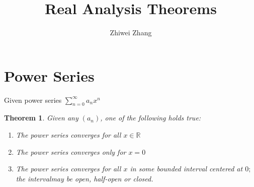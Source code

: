 \documentclass[12pt]{article}
\newtheorem{theorem}{Theorem}
\begin{document}
 
 
 
\title{Real Analysis Theorems}
\author{Zhiwei Zhang}
 
\maketitle
\section{Power Series}
Given power series $\sum _ { n = 0 } ^ { \infty } a _ { n } x ^ { n }$
\begin{theorem}
Given any $(a_n)$, one of the following holds true:
\begin{enumerate}
	\item The power series converges for all $x \in \mathbb{R}$
	\item The power series converges only for $x = 0$
	\item The power series converges for all $x$ in some bounded interval centered at $0 ;$ the intervalmay be open, half-open or closed.
\end{enumerate}
\end{theorem}
\end{document}
